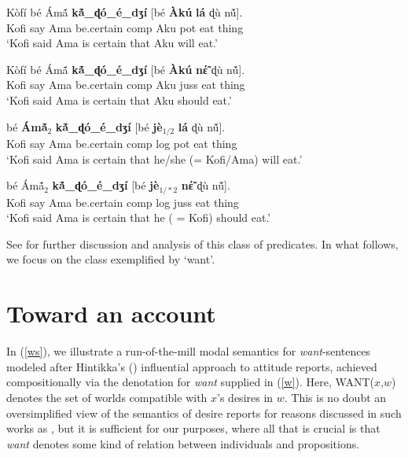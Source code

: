 \documentclass[output=paper
,modfonts
,nonflat]{langsci/langscibook}
\newcommand{\Z}{ʒ}
\newcommand{\D}{ɖ}
\newcommand{\á}{\'{ã}}
\newcommand{\É}{\'{\~{ε}}}
\newcommand{\È}{\`{\~{ε}}}
\newcommand{\í}{\'{\~{i}}}
\newcommand{\ì}{\`{\~{i}}}
\newcommand{\Ó}{\'{\~{ɔ}}}
\newcommand{\Ò}{\`{\~{ɔ}}}
\newcommand{\ú}{\'{ũ}}
\newcommand{\ù}{\`{ũ}}
\begin{document}
\ea
\gll K\`of\'i b\'e \'Am\'{\~a} {\bf k\'{\~a}\_{\D}\'o\_\'e\_d{\Z}\'i} [b\'e {\bf \`Ak\'u} {\bf l\'a} {\D}\`u n\'{\~u}].\\
Kofi say Ama be.certain {\sc comp} Aku {\sc pot} eat thing\\
\glt`Kofi said Ama is certain that Aku will eat.' \label{bal}  
\z

\ea
\gll K\`of\'i b\'e \'Am\'{\~a}  {\bf k\'{\~a}\_{\D}\'o\_\'e\_d{\Z}\'i} [b\'e {\bf \`Ak\'u} {\bf n{\É}} {\D}\`u n\'{\~u}].\\
Kofi say Ama be.certain {\sc comp} Aku {\sc juss} eat thing\\
\glt `Kofi said Ama is certain that Aku should eat.' \label{ban}  
\z

\ea 
{} b\'e {\bf \'Am\'{\~a}$_{2}$} {\bf k\'{\~a}\_{\D}\'o\_\'e\_d{\Z}\'i} [b\'e {\bf j\`e$_{1/2}$} {\bf l\'a} {\D}\`u n\'{\~u}].\\
Kofi say Ama be.certain {\sc comp} {\sc log} {\sc pot} eat thing\\
\glt `Kofi said Ama is certain that he/she (= Kofi/Ama) will eat.'  \label{bal2}
\z

\ea
{} b\'e  \'Am\'{\~a}$_{2}$ {\bf k\'{\~a}\_{\D}\'o\_\'e\_d{\Z}\'i} [b\'e {\bf j\`e$_{1/*2}$} {\bf n{\É}} {\D}\`u n\'{\~u}].\\
Kofi say Ama be.certain {\sc comp} {\sc log} {\sc juss} eat thing\\
\glt `Kofi said Ama is certain that he ( = Kofi) should eat.'  \label{ban2}
\z

\noindent See \cite{gl17} for further discussion and analysis of this class of predicates. In what follows, we focus on the class exemplified by `want'.



\section{Toward an account}

In  (\ref{ws}), we illustrate a run-of-the-mill modal semantics for {\em want}-sentences modeled after Hintikka's (\citeyear{hintikka69}) influential approach to attitude reports, achieved compositionally via the denotation for {\em want} supplied in (\ref{w}). Here, WANT($x$,$w$) denotes the set of worlds compatible with $x$'s desires in $w$. This is no doubt an oversimplified view of the semantics of desire reports for reasons discussed in such works as \cite{heim92}, but it is sufficient for our purposes, where all that is crucial is that {\em want} denotes some kind of relation between individuals and propositions.
\end{document}
